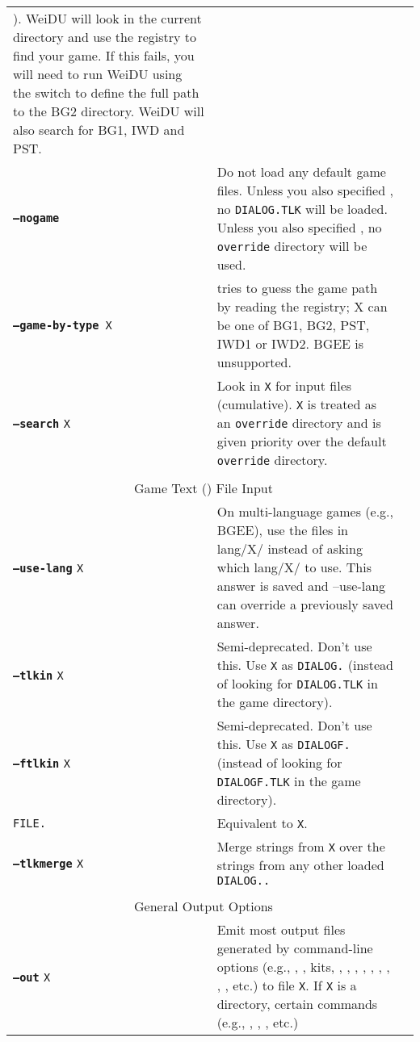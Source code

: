 \documentclass{article}
\def\ttref#1{\ahrefloc{#1}{\tt #1}}
\def\DEFINE#1{{\tt \bf #1}\label{#1}\index{#1}}
\def\t#1{{\tt #1}}
\begin{document}
\begin{tabular}{lp{10in}|p{10in}}
\ttref{--search}). WeiDU will look in the current directory and use the
registry to find your game. If this fails, you will need to run WeiDU using
the \ttref{--game} switch to define the full path to the BG2 directory.
WeiDU will also search for BG1, IWD and PST. \\
\DEFINE{--nogame}  & Do not
load any default game files. Unless you also specified \ttref{--tlkin}, no
\t{DIALOG.TLK} will be loaded. Unless you also specified \ttref{--search},
no \t{override} directory will be used. \\
{\tt \DEFINE{--game-by-type} X} & tries to guess the game path by reading
the registry; X can be one of BG1, BG2, PST, IWD1 or IWD2. BGEE is unsupported.
\\
\DEFINE{--search} \t{X}	& Look in {\tt X} for input files (cumulative).
\t{X} is treated as an \t{override} directory and is given priority over
the default \t{override} directory. \\
\\
\multicolumn{2}{c}{ \color{red} Game Text (\ttref{TLK}) File Input} \\
\DEFINE{--use-lang} \t{X} & On multi-language games (e.g., BGEE), use the files
in lang/X/ instead of asking which lang/X/ to use. This answer is saved
and --use-lang can override a previously saved answer.\\
\DEFINE{--tlkin} \t{X}	& Semi-deprecated. Don't use this. Use {\tt X} as {\tt DIALOG.}\ttref{TLK} (instead
of looking for \t{DIALOG.TLK} in the game directory). \\
\DEFINE{--ftlkin} \t{X} & Semi-deprecated. Don't use this. Use {\tt X} as {\tt DIALOGF.}\ttref{TLK} (instead
of looking for \t{DIALOGF.TLK} in the game directory). \\
\tt{FILE.}\ttref{TLK} & Equivalent to \ttref{--tlkin} \t{X}. \\
\DEFINE{--tlkmerge} \t{X}	& Merge strings from {\tt X} over the strings from any other loaded {\tt \t{DIALOG.}\ttref{TLK}.} \\
\\
\multicolumn{2}{c}{ \color{red} General Output Options} \\
\DEFINE{--out} \t{X} &	Emit most output files generated by command-line
options (e.g., \ttref{D}, \ttref{DLG}, kits, \ttref{--biff-get},
\ttref{BAF}, \ttref{BCS}, \ttref{--automate}, \ttref{--traify-tlk},
\ttref{--extract-kits}, \ttref{--list-biff}, \ttref{--cmp-from},
\ttref{--dcmp-from}, etc.) to file {\tt X}. If \t{X} is a directory,
certain commands (e.g., \ttref{D}, \ttref{DLG}, \ttref{--biff-get}, etc.)

\end{tabular}
\end{document}
